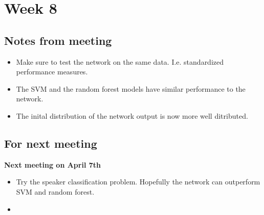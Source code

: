 
\section{Week 8}

\subsection{Notes from meeting}

\begin{itemize}
\item Make sure to test the network on the same data. I.e. standardized performance measures.
\item The SVM and the random forest models have similar performance to the network.
\item The inital distribution of the network output is now more well ditributed. 
\end{itemize}

\subsection{For next meeting}

\textbf{Next meeting on April 7th}

\begin{itemize}
\item Try the speaker classification problem. Hopefully the network can outperform
SVM and random forest.
\item
\end{itemize}
